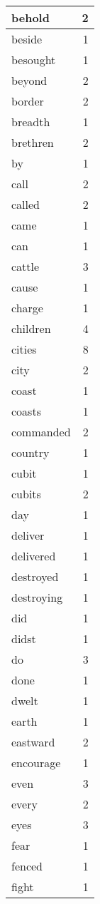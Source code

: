 \begin{center}
\begin{longtable}{l|r}
behold & 2 \\ \hline
beside & 1 \\ \hline
besought & 1 \\ \hline
beyond & 2 \\ \hline
border & 2 \\ \hline
breadth & 1 \\ \hline
brethren & 2 \\ \hline
by & 1 \\ \hline
call & 2 \\ \hline
called & 2 \\ \hline
came & 1 \\ \hline
can & 1 \\ \hline
cattle & 3 \\ \hline
cause & 1 \\ \hline
charge & 1 \\ \hline
children & 4 \\ \hline
cities & 8 \\ \hline
city & 2 \\ \hline
coast & 1 \\ \hline
coasts & 1 \\ \hline
commanded & 2 \\ \hline
country & 1 \\ \hline
cubit & 1 \\ \hline
cubits & 2 \\ \hline
day & 1 \\ \hline
deliver & 1 \\ \hline
delivered & 1 \\ \hline
destroyed & 1 \\ \hline
destroying & 1 \\ \hline
did & 1 \\ \hline
didst & 1 \\ \hline
do & 3 \\ \hline
done & 1 \\ \hline
dwelt & 1 \\ \hline
earth & 1 \\ \hline
eastward & 2 \\ \hline
encourage & 1 \\ \hline
even & 3 \\ \hline
every & 2 \\ \hline
eyes & 3 \\ \hline
fear & 1 \\ \hline
fenced & 1 \\ \hline
fight & 1 \\ \hline

\end{longtable}
\end{center}
